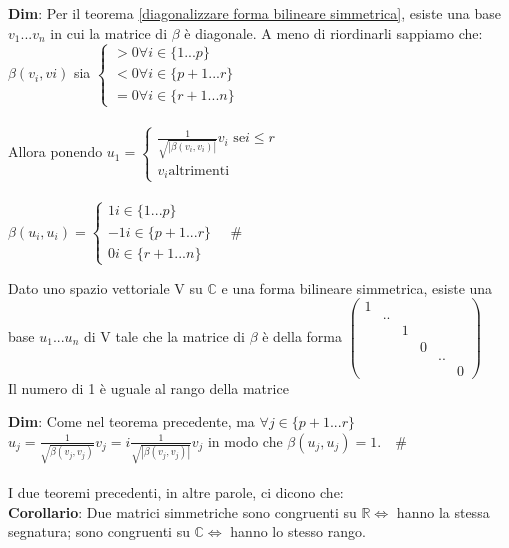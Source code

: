 \documentclass[12pt]{article}
\begin{document}
\textbf{Dim}: Per il teorema \ref{diagonalizzare forma bilineare simmetrica}, esiste una base $v_1...v_n$ in cui la matrice di $\beta$ è diagonale. A meno di riordinarli sappiamo che:\\
$\beta(v_i,vi)$ sia $\begin{cases}
    > 0 \forall i \in \{1...p\}\\
    < 0 \forall i \in \{p+1...r\}\\
    = 0 \forall i \in \{r+1...n\}
\end{cases}$\\\\
Allora ponendo $u_1 = \begin{cases}
    \frac{1}{\sqrt{|\beta(v_i,v_i)|}}v_i \text{ se} i \leq r\\
    v_i \text{altrimenti}
\end{cases} $\\\\
$\beta(u_i,u_i) = \begin{cases}
    1 i\in \{1...p\}\\
    -1 i \in \{p+1...r\}\\
    0 i \in \{r+1...n\}
\end{cases}\quad \#$\\
\begin{theorem}
    Dato uno spazio vettoriale V su $\mathbb{C}$ e una forma bilineare simmetrica, esiste una base $u_1...u_n$ di V tale che la matrice di $\beta$ è della forma $\begin{pmatrix}
        1 & & & & &  \\
        & .. & & & & \\
        & & 1 & & &\\
        & & & 0 & &\\
        & & & & .. &\\
        & & & & & 0
    \end{pmatrix}$\\
    Il numero di 1 è uguale al rango della matrice
\end{theorem}

\noindent\textbf{Dim}: Come nel teorema precedente, ma $\forall j\in \{p+1...r\}$ $u_j = \frac{1}{\sqrt{\beta(v_j,v_j)}}v_j = i\frac{1}{\sqrt{|\beta(v_j,v_j)|}}v_j$
in modo che $\beta(u_j,u_j) = 1. \quad \#$\\\\
I due teoremi precedenti, in altre parole, ci dicono che:\\
\textbf{Corollario}: Due matrici simmetriche sono congruenti su $\mathbb{R} \iff$ hanno la stessa segnatura; sono congruenti su $\mathbb{C} \iff$ hanno lo stesso rango.
\end{document}
